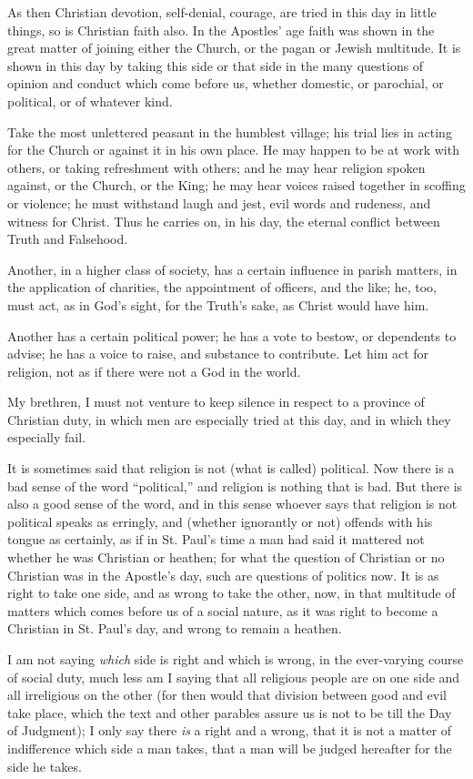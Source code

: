 As then Christian devotion, self-denial, courage, are tried in this
day in little things, so is Christian faith also. In the Apostles'
age faith was shown in the great matter of joining either the Church,
or the pagan or Jewish multitude. It is shown in this day by taking
this side or that side in the many questions of opinion and conduct
which come before us, whether domestic, or parochial, or political, or
of whatever kind.

Take the most unlettered peasant in the humblest village; his trial
lies in acting for the Church or against it in his own place. He may
happen to be at work with others, or taking refreshment with others;
and he may hear religion spoken against, or the Church, or the King;
he may hear voices raised together in scoffing or violence; he must
withstand laugh and jest, evil words and rudeness, and witness for
Christ. Thus he carries on, in his day, the eternal conflict between
Truth and Falsehood.

Another, in a higher class of society, has a certain influence in
parish matters, in the application of charities, the appointment of
officers, and the like; he, too, must act, as in God's sight, for
the Truth's sake, as Christ would have him.

Another has a certain political power; he has a vote to bestow, or
dependents to advise; he has a voice to raise, and substance to
contribute. Let him act for religion, not as if there were not a God
in the world.

My brethren, I must not venture to keep silence in respect to a
province of Christian duty, in which men are especially tried at this
day, and in which they especially fail.

It is sometimes said that religion is not (what is called)
political. Now there is a bad sense of the word ``political,''
and religion is nothing that is bad. But there is also a good sense of
the word, and in this sense whoever says that religion is not
political speaks as erringly, and (whether ignorantly or not) offends
with his tongue as certainly, as if in St. Paul's time a man had
said it mattered not whether he was Christian or heathen; for what the
question of Christian or no Christian was in the Apostle's day, such
are questions of politics now. It is as right to take one side, and as
wrong to take the other, now, in that multitude of matters which comes
before us of a social nature, as it was right to become a Christian in
St. Paul's day, and wrong to remain a heathen.

I am not saying \emph{which} side is right and which is wrong, in
the ever-varying course of social duty, much less am I saying that all
religious people are on one side and all irreligious on the other (for
then would that division between good and evil take place, which the
text and other parables assure us is not to be till the Day of
Judgment); I only say there \emph{is} a right and a wrong, that it is
not a matter of indifference which side a man takes, that a man will
be judged hereafter for the side he takes.

